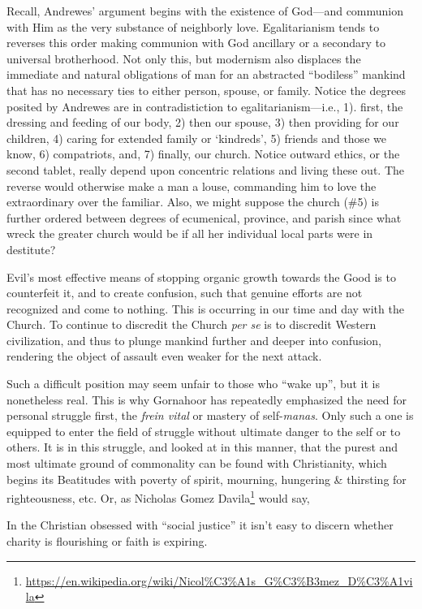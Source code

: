 \begin{quotex}
Recall, Andrewes' argument begins with the existence of God---and communion with Him as the very substance of neighborly love. Egalitarianism tends to reverses this order making communion with God ancillary or a secondary to universal brotherhood. Not only this, but modernism also displaces the immediate and natural obligations of man for an abstracted ``bodiless'' mankind that has no necessary ties to either person, spouse, or family. Notice the degrees posited by Andrewes are in contradistiction to egalitarianism---i.e., 1). first, the dressing and feeding of our body, 2) then our spouse, 3) then providing for our children, 4) caring for extended family or `kindreds', 5) friends and those we know, 6) compatriots, and, 7) finally, our church. Notice outward ethics, or the second tablet, really depend upon concentric relations and living these out. The reverse would otherwise make a man a louse, commanding him to love the extraordinary over the familiar. Also, we might suppose the church (\#5) is further ordered between degrees of ecumenical, province, and parish since what wreck the greater church would be if all her individual local parts were in destitute?
\end{quotex}


Evil's most effective means of stopping organic growth towards the Good is to counterfeit it, and to create confusion, such that genuine efforts are not recognized and come to nothing. This is occurring in our time and day with the Church. To continue to discredit the Church \emph{per se} is to discredit Western civilization, and thus to plunge mankind further and deeper into confusion, rendering the object of assault even weaker for the next attack.

Such a difficult position may seem unfair to those who ``wake up'', but it is nonetheless real. This is why Gornahoor has repeatedly emphasized the need for personal struggle first, the \emph{frein vital} or mastery of self-\emph{manas}. Only such a one is equipped to enter the field of struggle without ultimate danger to the self or to others. It is in this struggle, and looked at in this manner, that the purest and most ultimate ground of commonality can be found with Christianity, which begins its Beatitudes with poverty of spirit, mourning, hungering \& thirsting for righteousness, etc. Or, as Nicholas Gomez Davila\footnote{\url{https://en.wikipedia.org/wiki/Nicol\%C3\%A1s\_G\%C3\%B3mez\_D\%C3\%A1vila}} would say,

\begin{quotex}
In the Christian obsessed with ``social justice'' it isn't easy to discern whether charity is flourishing or faith is expiring.
\end{quotex}


